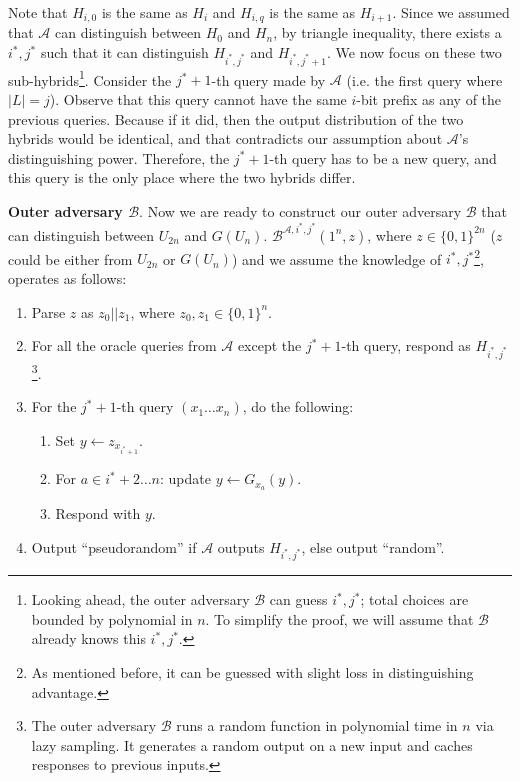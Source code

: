 Note that $H_{i, 0}$ is the same as $H_i$ and $H_{i, q}$ is the same as $H_{i+1}$. Since we assumed that $\mathcal{A}$ can distinguish between $H_0$ and $H_n$, by triangle inequality, there exists a $i^*, j^*$ such that it can distinguish $H_{i^*,j^*}$ and $H_{i^*,j^*+1}$. We now focus on these two sub-hybrids\footnote{Looking ahead, the outer adversary $\mathcal{B}$ can guess $i^*, j^*$; total choices are bounded by polynomial in $n$. To simplify the proof, we will assume that $\mathcal{B}$ already knows this $i^*, j^*$.}. Consider the $j^*+1$-th query made by $\mathcal{A}$ (i.e. the first query where $|L|=j$). Observe that this query cannot have the same $i$-bit prefix as any of the previous queries. Because if it did, then the output distribution of the two hybrids would be identical, and that contradicts our assumption about $\mathcal{A}$'s distinguishing power. Therefore, the $j^*+1$-th query has to be a new query, and this query is the only place where the two hybrids differ.\smallskip

\noindent \textbf{Outer adversary $\mathcal{B}$}. Now we are ready to construct our outer adversary $\mathcal{B}$ that can distinguish between $U_{2n}$ and $G(U_n)$. $\mathcal{B}^{\mathcal{A}, i^*, j^*}(1^n, z)$, where $z \in \{0, 1\}^{2n}$ ($z$ could be either from $U_{2n}$ or $G(U_n)$) and we assume the knowledge of $i^*, j^*$\footnote{As mentioned before, it can be guessed with slight loss in distinguishing advantage.}, operates as follows:
\begin{enumerate}
    \item Parse $z$ as $z_0||z_1$, where $z_0, z_1 \in \{0, 1\}^n$.
    \item For all the oracle queries from $\mathcal{A}$ except the $j^*+1$-th query, respond as $H_{i^*,j^*}$\footnote{The outer adversary $\mathcal{B}$ runs a random function in polynomial time in $n$ via lazy sampling. It generates a random output on a new input and caches responses to previous inputs.}.
    \item For the $j^*+1$-th query $(x_1\dots x_n)$, do the following:
          \begin{enumerate}
              \item Set $y \gets z_{x_{i^*+1}}$.
              \item For $a \in i^*+2 \dots n$: update $y \gets G_{x_a}(y)$.
              \item Respond with $y$.
          \end{enumerate}
    \item Output ``pseudorandom'' if $\mathcal{A}$ outputs $H_{i^*,j^*}$, else output ``random''.
\end{enumerate}

